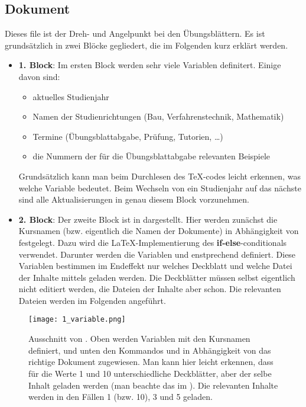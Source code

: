 \subsection{Dokument }

Dieses file ist der Dreh- und Angelpunkt bei den Übungsblättern. Es ist
grundsätzlich in zwei Blöcke gegliedert, die im Folgenden kurz erklärt werden.

\begin{itemize}
 \item {\bf 1. Block}: Im ersten Block werden sehr viele Variablen definitert. 
   Einige davon sind:
   \begin {itemize}
    \item aktuelles Studienjahr
    \item Namen der Studienrichtungen (Bau, Verfahrenstechnik, Mathematik)
    \item Termine (Übungsblattabgabe, Prüfung, Tutorien, \dots)
    \item die Nummern der für die Übungsblattabgabe relevanten Beispiele
   \end{itemize}
   Grundsätzlich kann man beim Durchlesen des \TeX-codes leicht erkennen, was
   welche Variable bedeutet. Beim Wechseln von ein Studienjahr auf das nächste
   sind alle Aktualisierungen in genau diesem Block vorzunehmen.
 \item {\bf 2. Block}: Der zweite Block ist in  
   dargestellt. Hier werden zunächst die Kursnamen (bzw. eigentlich die Namen
   der Dokumente) in Abhängigkeit von 
   festgelegt. Dazu wird die \LaTeX-Implementierung des 
   {\bf if-else}-conditionals  verwendet.
   Darunter werden die Variablen  und
    enstprechend definiert. Diese Variablen
   bestimmen im Endeffekt nur welches Deckblatt und welche Datei der Inhalte
   mittels  geladen werden. Die 
   Deckblätter müssen selbst eigentlich nicht editiert werden, die 
   Dateien der Inhalte aber schon. Die relevanten Dateien werden im Folgenden 
   angeführt.
\end{itemize}

\begin{figure}[htbp]
  \texttt{[image: 1\_variable.png]}
  \caption{Ausschnitt von . Oben werden Variablen mit
    den Kursnamen definiert, und unten den Kommandos
     und 
    in Abhängigkeit von  das richtige Dokument
    zugewiesen. Man kann hier leicht erkennen, dass für die Werte 1 und 10
    unterschiedliche Deckblätter, aber der selbe Inhalt geladen werden
    (man beachte das  im ). Die
    relevanten Inhalte werden in den Fällen 1 (bzw. 10), 3 und 5 geladen.}
  \label{fig:variable}
\end{figure}

